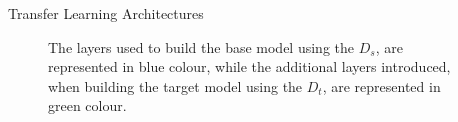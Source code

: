 \documentclass{beamer}
\begin{document}
\begin{frame}{Transfer Learning Architectures}  
\begin{figure}[ht]
\centering
{}%
{}%
\caption{\tiny The layers used to build the base model using the $D_s$, are represented in blue colour, while the additional layers introduced, when building the target model using the $D_t$, are represented in green colour.}
\label{fig:transfarch}
\end{figure}
\end{frame}
\end{document}
